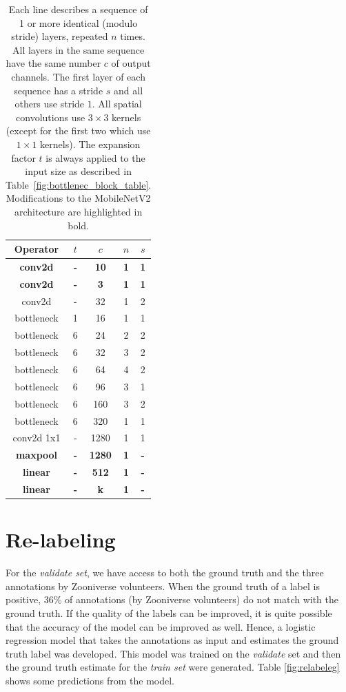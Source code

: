 \documentclass{article}
\begin{document}
\begin{sloppy}
\begin{table}[]
\centering
\vspace{0pt}
\begin{tabular}{c|c|c|c|c}
Operator & $t$ & $c$ & $n$ & $s$ \\ \hline
\textbf{conv2d} & \textbf{-} & \textbf{10} & \textbf{1} & \textbf{1} \\
\textbf{conv2d} & \textbf{-} & \textbf{3} & \textbf{1} & \textbf{1} \\
conv2d & - & 32 & 1 & 2 \\
bottleneck & 1 & 16 & 1 & 1 \\
bottleneck & 6 & 24 & 2 & 2 \\
bottleneck & 6 & 32 & 3 & 2 \\
bottleneck & 6 & 64 & 4 & 2 \\
bottleneck & 6 & 96 & 3 & 1 \\
bottleneck & 6 & 160 & 3 & 2 \\
bottleneck & 6 & 320 & 1 & 1 \\
conv2d 1x1 & - & 1280 & 1 & 1 \\
\textbf{maxpool} & \textbf{-} & \textbf{1280} & \textbf{1} & \textbf{-} \\
\textbf{linear} & \textbf{-} & \textbf{512} & \textbf{1} & \textbf{-} \\
\textbf{linear} & \textbf{-} & \textbf{k} & \textbf{1} & \textbf{-} \\ \hline
\end{tabular}
\caption {Each line describes a sequence of 1 or more identical (modulo stride)  layers, repeated $n$ times. All layers in the same sequence have the same number $c$ of output channels. The first layer of each sequence has a stride $s$ and all others use stride $1$. All spatial convolutions use $3\times 3$ kernels (except for the first two which use $1\times 1$ kernels). The expansion factor $t$ is always applied to the input size as described in Table~\ref{fig:bottlenec_block_table}. Modifications to the MobileNetV2 architecture are highlighted in bold.}
\label{mobilenet:arch}
\end{table}

\section{Re-labeling}
\label{sec:relabeling}

For the \textit{validate set}, we have access to both the ground truth and the three annotations by Zooniverse volunteers. When the ground truth of a label is positive, 36\% of annotations (by Zooniverse volunteers) do not match with the ground truth. If the quality of the labels can be improved, it is quite possible that the accuracy of the model can be improved as well. Hence, a logistic regression model that takes the annotations as input and estimates the ground truth label was developed. This model was trained on the \textit{validate} set and then the ground truth estimate for the \textit{train set} were generated. Table \ref{fig:relabeleg} shows some predictions from the model.


\end{sloppy}
\end{document}
